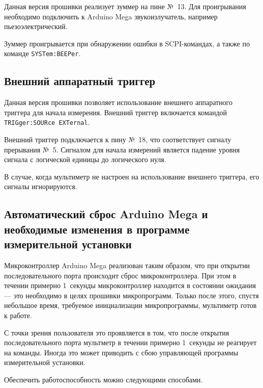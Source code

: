 \documentclass[12pt, a4paper]{article}
\newcommand{\Arduino}{Arduino Mega}
\begin{document}
Данная версия прошивки реализует зуммер на пине №~13. Для проигрывания необходимо подключить к {\Arduino} звукоизлучатель, например пьезоэлектрический.

Зуммер проигрывается при обнаружении ошибки в SCPI-командах, а также по команде {\tt SYSTem:BEEPer}.

\subsection{Внешний аппаратный триггер}

Данная версия прошивки позволяет использование внешнего аппаратного триггера для начала измерения. Внешний триггер включается командой {\tt TRIGger:SOURce EXTernal}.

Внешний триггер подключается к пину №~18, что соответствует сигналу прерывания №~5. Сигналом для начала измерений является падение уровня сигнала с логической единицы до логического нуля. 

В случае, когда мультиметр не настроен на использование внешнего триггера, его сигналы игнорируются.

\subsection{Автоматический сброс {\Arduino} и необходимые изменения в программе измерительной установки}

Микроконтроллер {\Arduino} реализован таким образом, что при открытии последовательного порта происходит сброс микроконтроллера. При этом в течении примерно 1~секунды микроконтроллер находится в состоянии ожидания --- это необходимо в целях прошивки микропрограмм. Только после этого, спустя небольшое время, требуемое инициализации микропрограммы, мультиметр готов к работе.

С точки зрения пользователя это проявляется в том, что после открытия последовательного порта мультметр в течении примерно 1~секунды не реагирует на команды. Иногда это может приводить с сбою управляющей программы измерительной установки.

Обеспечить работоспособность можно следующими способами.
\end{document}
